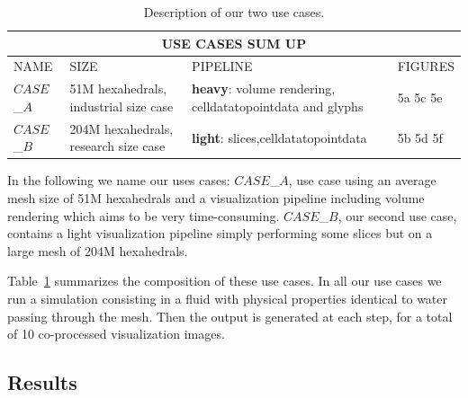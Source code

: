 \begin{table}
\centering
\begin{tabular}{|p{1.5cm}|p{3.0cm}|p{2.70cm}|p{1.50cm}|}
\hline
\multicolumn{4}{|c|}{\textbf{USE CASES SUM UP}}\\
\hline
NAME & SIZE & PIPELINE & FIGURES \\
\hline
$CASE$\_$A$ & 51M hexahedrals, \newline industrial size case & \textbf{heavy}:
\newline volume rendering, \newline celldatatopointdata \newline and glyphs  &
5a 5c 5e\\
\hline
$CASE$\_$B$ & 204M hexahedrals, \newline research size case & \textbf{light}:
\newline 9 slices,\newline celldatatopointdata  & 5b 5d 5f   \\
\hline
\end{tabular}
\caption{Description of our two use cases.}
\label{fig:tab}
\vspace{-0.15in}
\end{table}
In the following we name our uses cases:
$CASE$\_$A$, use case using an average mesh size of 51M hexahedrals and a
visualization pipeline including volume rendering which aims to be very time-consuming.
$CASE$\_$B$, our second use case, contains a light visualization pipeline simply
performing some slices but on a large mesh of 204M hexahedrals.

Table~\ref{fig:tab} summarizes the composition of these use cases. In all our use cases we
run a simulation consisting in a fluid with physical properties identical to
water passing through the mesh. Then the output is generated at each step, for a
total of 10 co-processed visualization images.

\subsection{Results}

